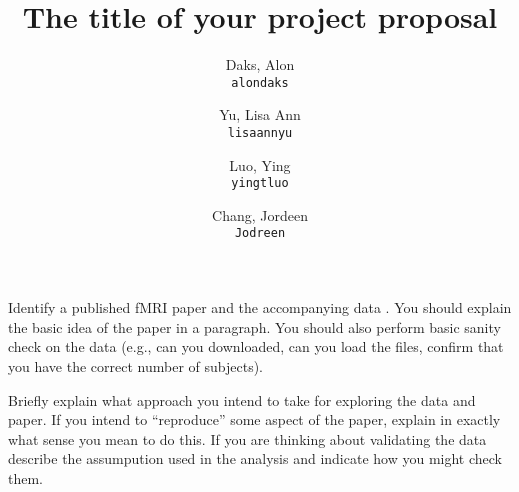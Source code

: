\documentclass[11pt]{article}
\title{The title of your project proposal}
\author{
  Daks, Alon\\
  \texttt{alondaks}
  \and
  Yu, Lisa Ann\\
  \texttt{lisaannyu}
  \and
  Luo, Ying\\
  \texttt{yingtluo}
  \and
  Chang, Jordeen\\
  \texttt{Jodreen}
}
\begin{document}
\maketitle

Identify a published fMRI paper and the accompanying data
\cite{lindquist2008statistical}.  You should explain the basic idea of the
paper in a paragraph.  You should also perform basic sanity check on the data
(e.g., can you downloaded, can you load the files, confirm that you have the
correct number of subjects).

Briefly explain what approach you intend to take for exploring
the data and paper.  If you intend to ``reproduce'' some aspect of the paper,
explain in exactly what sense you mean to do this.  If you are thinking about
validating the data describe the assumpution used in the analysis and indicate
how you might check them.


\end{document}
